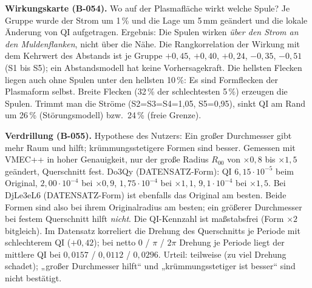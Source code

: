 \textbf{Wirkungskarte (B-054).} Wo auf der Plasmafläche wirkt welche Spule? Je Gruppe wurde der Strom um 1\,\% und die Lage um 5\,mm geändert und die
lokale Änderung von QI aufgetragen. Ergebnis: Die Spulen wirken \emph{über den Strom an den Muldenflanken}, nicht über die Nähe. Die Rangkorrelation der Wirkung mit dem
Kehrwert des Abstands ist je Gruppe $+0{,}45$, $+0{,}40$, $+0{,}24$, $-0{,}35$, $-0{,}51$ (S1 bis S5); ein Abstandsmodell hat keine Vorhersagekraft. Die hellsten
Flecken liegen auch ohne Spulen unter den hellsten 10\,\%: Es sind Formflecken der Plasmaform selbst. Breite Flecken (32\,\% der schlechtesten 5\,\%) erzeugen die Spulen.
Trimmt man die Ströme (S2=S3=S4=1,05, S5=0,95), sinkt QI am Rand um 26\,\% (Störungsmodell) bzw.\ 24\,\% (freie Grenze).

\textbf{Verdrillung (B-055).} Hypothese des Nutzers: Ein großer Durchmesser gibt mehr Raum und hilft; krümmungsstetigere Formen sind besser. Gemessen mit
VMEC++ in hoher Genauigkeit, nur der große Radius $R_{00}$ von $\times0{,}8$ bis $\times1{,}5$ geändert, Querschnitt fest. Do3Qy (DATENSATZ-Form): QI $6{,}15\cdot10^{-5}$ beim Original,
$2{,}00\cdot10^{-4}$ bei $\times0{,}9$, $1{,}75\cdot10^{-4}$ bei $\times1{,}1$, $9{,}1\cdot10^{-4}$ bei $\times1{,}5$. Bei DjLe3eL6 (DATENSATZ-Form) ist ebenfalls das Original am besten. Beide
Formen sind also bei ihrem Originalradius am besten; ein größerer Durchmesser bei festem Querschnitt hilft \emph{nicht}. Die QI-Kennzahl ist maßstabsfrei (Form $\times2$ bitgleich). Im Datensatz
korreliert die Drehung des Querschnitts je Periode mit schlechterem QI ($+0{,}42$); bei netto 0 / $\pi$ / $2\pi$ Drehung je Periode liegt der mittlere QI bei $0{,}0157$ / $0{,}0112$ / $0{,}0296$.
Urteil: teilweise (zu viel Drehung schadet); „großer Durchmesser hilft“ und „krümmungsstetiger ist besser“ sind nicht bestätigt.

